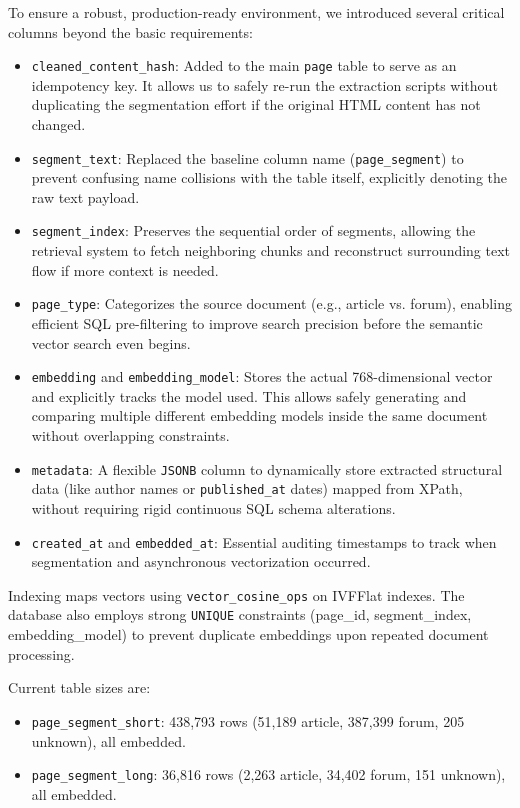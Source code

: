 \documentclass[9pt]{IEEEtran}
\begin{document}
To ensure a robust, production-ready environment, we introduced several critical columns beyond the basic requirements:
\begin{itemize}
    \item \texttt{cleaned\_content\_hash}: Added to the main \texttt{page} table to serve as an idempotency key. It allows us to safely re-run the extraction scripts without duplicating the segmentation effort if the original HTML content has not changed.
    \item \texttt{segment\_text}: Replaced the baseline column name (\texttt{page\_segment}) to prevent confusing name collisions with the table itself, explicitly denoting the raw text payload.
    \item \texttt{segment\_index}: Preserves the sequential order of segments, allowing the retrieval system to fetch neighboring chunks and reconstruct surrounding text flow if more context is needed.
    \item \texttt{page\_type}: Categorizes the source document (e.g., article vs. forum), enabling efficient SQL pre-filtering to improve search precision before the semantic vector search even begins.
    \item \texttt{embedding} and \texttt{embedding\_model}: Stores the actual 768-dimensional vector and explicitly tracks the model used. This allows safely generating and comparing multiple different embedding models
    inside the same document without overlapping constraints.
    \item \texttt{metadata}: A flexible \texttt{JSONB} column to dynamically store extracted structural data (like author names or \texttt{published\_at} dates) mapped from XPath, without requiring rigid continuous SQL schema alterations.
    \item \texttt{created\_at} and \texttt{embedded\_at}: Essential auditing timestamps to track when segmentation and asynchronous vectorization occurred.
\end{itemize}

Indexing maps vectors using \texttt{vector\_cosine\_ops} on IVFFlat indexes.
The database also employs strong \texttt{UNIQUE} constraints (page\_id, segment\_index, embedding\_model) to prevent duplicate embeddings upon repeated document processing.

Current table sizes are:
\begin{itemize}
    \item \texttt{page\_segment\_short}: 438,793 rows (51,189 article, 387,399 forum, 205 unknown), all embedded.
    \item \texttt{page\_segment\_long}: 36,816 rows (2,263 article, 34,402 forum, 151 unknown), all embedded.
\end{itemize}
\end{document}
